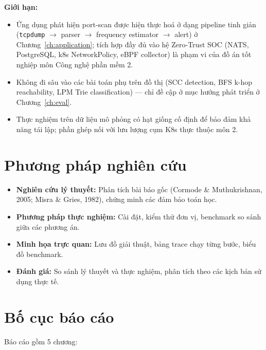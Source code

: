 \textbf{Giới hạn:}
\begin{itemize}
    \item Ứng dụng phát hiện port-scan được hiện thực hoá ở dạng pipeline tinh giản (\texttt{tcpdump} $\rightarrow$ parser $\rightarrow$ frequency estimator $\rightarrow$ alert) ở Chương~\ref{ch:application}; tích hợp đầy đủ vào hệ Zero-Trust SOC (NATS, PostgreSQL, k8s NetworkPolicy, eBPF collector) là phạm vi của đồ án tốt nghiệp môn Công nghệ phần mềm 2.
    \item Không đi sâu vào các bài toán phụ trên đồ thị (SCC detection, BFS k-hop reachability, LPM Trie classification) --- chỉ đề cập ở mục hướng phát triển ở Chương~\ref{ch:eval}.
    \item Thực nghiệm trên dữ liệu mô phỏng có hạt giống cố định để bảo đảm khả năng tái lập; phần ghép nối với lưu lượng cụm K8s thực thuộc môn 2.
\end{itemize}

\section*{Phương pháp nghiên cứu}

\begin{itemize}
    \item \textbf{Nghiên cứu lý thuyết:} Phân tích bài báo gốc (Cormode \& Muthukrishnan, 2005; Misra \& Gries, 1982), chứng minh các đảm bảo toán học.
    \item \textbf{Phương pháp thực nghiệm:} Cài đặt, kiểm thử đơn vị, benchmark so sánh giữa các phương án.
    \item \textbf{Minh họa trực quan:} Lưu đồ giải thuật, bảng trace chạy từng bước, biểu đồ benchmark.
    \item \textbf{Đánh giá:} So sánh lý thuyết và thực nghiệm, phân tích theo các kịch bản sử dụng thực tế.
\end{itemize}

\section*{Bố cục báo cáo}

Báo cáo gồm 5 chương:

